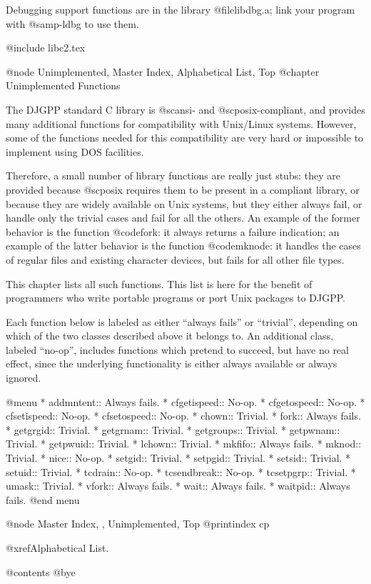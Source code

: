 Debugging support functions are in the library @file{libdbg.a}; link
your program with @samp{-ldbg} to use them.

@include libc2.tex

@node Unimplemented, Master Index, Alphabetical List, Top
@chapter Unimplemented Functions

The DJGPP standard C library is @sc{ansi}- and @sc{posix}-compliant, and
provides many additional functions for compatibility with Unix/Linux
systems.  However, some of the functions needed for this compatibility
are very hard or impossible to implement using DOS facilities.

Therefore, a small number of library functions are really just stubs:
they are provided because @sc{posix} requires them to be present in a
compliant library, or because they are widely available on Unix systems,
but they either always fail, or handle only the trivial cases and fail
for all the others.  An example of the former behavior is the function
@code{fork}: it always returns a failure indication; an example of the
latter behavior is the function @code{mknode}: it handles the cases of
regular files and existing character devices, but fails for all other
file types.

This chapter lists all such functions.  This list is here for the
benefit of programmers who write portable programs or port Unix packages
to DJGPP.

Each function below is labeled as either ``always fails'' or
``trivial'', depending on which of the two classes described above it
belongs to.  An additional class, labeled ``no-op'', includes functions
which pretend to succeed, but have no real effect, since the underlying
functionality is either always available or always ignored.

@menu
* addmntent::                Always fails.
* cfgetispeed::              No-op.
* cfgetospeed::              No-op.
* cfsetispeed::              No-op.
* cfsetospeed::              No-op.
* chown::                    Trivial.
* fork::                     Always fails.
* getgrgid::                 Trivial.
* getgrnam::                 Trivial.
* getgroups::                Trivial.
* getpwnam::                 Trivial.
* getpwuid::                 Trivial.
* lchown::                   Trivial.
* mkfifo::                   Always fails.
* mknod::                    Trivial.
* nice::                     No-op.
* setgid::                   Trivial.
* setpgid::                  Trivial.
* setsid::                   Trivial.
* setuid::                   Trivial.
* tcdrain::                  No-op.
* tcsendbreak::              No-op.
* tcsetpgrp::                Trivial.
* umask::                    Trivial.
* vfork::                    Always fails.
* wait::                     Always fails.
* waitpid::                  Always fails.
@end menu

@node Master Index, , Unimplemented, Top
@printindex cp

@xref{Alphabetical List}.

@contents
@bye

